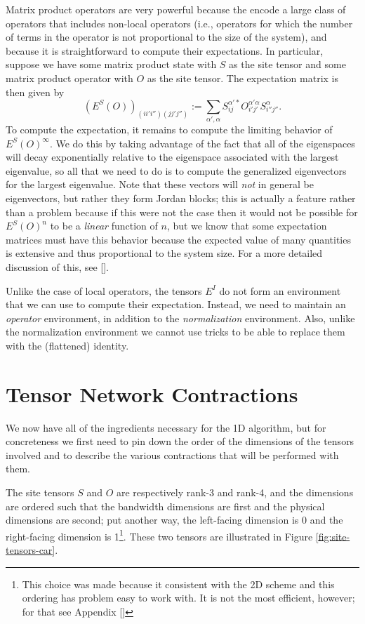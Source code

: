 \documentclass{article}
\begin{document}
Matrix product operators are very powerful because the encode a large class of operators that includes non-local operators (i.e., operators for which the number of terms in the operator is not proportional to the size of the system), and because it is straightforward to compute their expectations.  In particular, suppose we have some matrix product state with $S$ as the site tensor and some matrix product operator with $O$ as the site tensor.  The expectation matrix is then given by $$(E^S(O))_{(ii'i'')(jj'j'')} := \sum_{\alpha',\alpha} S^{\alpha'*}_{ij}O^{\alpha'\alpha}_{i'j'}S^{\alpha}_{i''j''}.$$  To compute the expectation, it remains to compute the limiting behavior of $E^S(O)^\infty$.  We do this by taking advantage of the fact that all of the eigenspaces will decay exponentially relative to the eigenspace associated with the largest eigenvalue, so all that we need to do is to compute the generalized eigenvectors for the largest eigenvalue.  Note that these vectors will \emph{not} in general be eigenvectors, but rather they form Jordan blocks;  this is actually a feature rather than a problem because if this were not the case then it would not be possible for $E^S(O)^n$ to be a \emph{linear} function of $n$, but we know that some expectation matrices must have this behavior because the expected value of many quantities is extensive and thus proportional to the system size.  For a more detailed discussion of this, see [].

Unlike the case of local operators, the tensors $E^I$ do not form an environment that we can use to compute their expectation.  Instead, we need to maintain an \emph{operator} environment, in addition to the \emph{normalization} environment.  Also, unlike the normalization environment we cannot use tricks to be able to replace them with the (flattened) identity.

\section{Tensor Network Contractions}

We now have all of the ingredients necessary for the 1D algorithm, but for concreteness we first need to pin down the order of the dimensions of the tensors involved and to describe the various contractions that will be performed with them.

The site tensors $S$ and $O$ are respectively rank-3 and rank-4, and the dimensions are ordered such that the bandwidth dimensions are first and the physical dimensions are second; put another way, the left-facing dimension is 0 and the right-facing dimension is 1\footnote{This choice was made because it consistent with the 2D scheme and this ordering has problem easy to work with.  It is not the most efficient, however;  for that see Appendix []}.  These two tensors are illustrated in Figure \ref{fig:site-tensors-car}.
\end{document}
